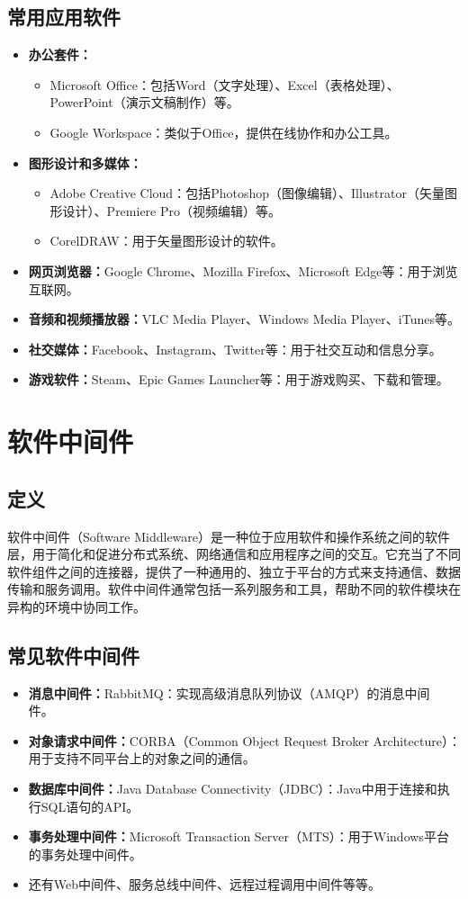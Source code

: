 \documentclass[11pt, a4paper, oneside]{ctexbook}
\begin{document}
\subsection{常用应用软件}
\begin{itemize}
    \item \textbf{办公套件：}
    \begin{itemize}
        \item Microsoft Office：包括Word（文字处理）、Excel（表格处理）、PowerPoint（演示文稿制作）等。
        \item Google Workspace：类似于Office，提供在线协作和办公工具。
    \end{itemize}
    \item \textbf{图形设计和多媒体：}
    \begin{itemize}
        \item Adobe Creative Cloud：包括Photoshop（图像编辑）、Illustrator（矢量图形设计）、Premiere Pro（视频编辑）等。
        \item CorelDRAW：用于矢量图形设计的软件。
    \end{itemize}
    \item \textbf{网页浏览器：}Google Chrome、Mozilla Firefox、Microsoft Edge等：用于浏览互联网。
    \item \textbf{音频和视频播放器：}VLC Media Player、Windows Media Player、iTunes等。
    \item \textbf{社交媒体：}Facebook、Instagram、Twitter等：用于社交互动和信息分享。
    \item \textbf{游戏软件：}Steam、Epic Games Launcher等：用于游戏购买、下载和管理。
\end{itemize}
\section{软件中间件}
\subsection{定义}
软件中间件（Software Middleware）是一种位于应用软件和操作系统之间的软件层，用于简化和促进分布式系统、网络通信和应用程序之间的交互。它充当了不同软件组件之间的连接器，提供了一种通用的、独立于平台的方式来支持通信、数据传输和服务调用。软件中间件通常包括一系列服务和工具，帮助不同的软件模块在异构的环境中协同工作。
\subsection{常见软件中间件}
\begin{itemize}
    \item \textbf{消息中间件：}RabbitMQ：实现高级消息队列协议（AMQP）的消息中间件。\
    \item \textbf{对象请求中间件：}CORBA（Common Object Request Broker Architecture）：用于支持不同平台上的对象之间的通信。
    \item \textbf{数据库中间件：}Java Database Connectivity（JDBC）：Java中用于连接和执行SQL语句的API。
    \item \textbf{事务处理中间件：}Microsoft Transaction Server（MTS）：用于Windows平台的事务处理中间件。
    \item 还有Web中间件、服务总线中间件、远程过程调用中间件等等。
\end{itemize}
\end{document}
